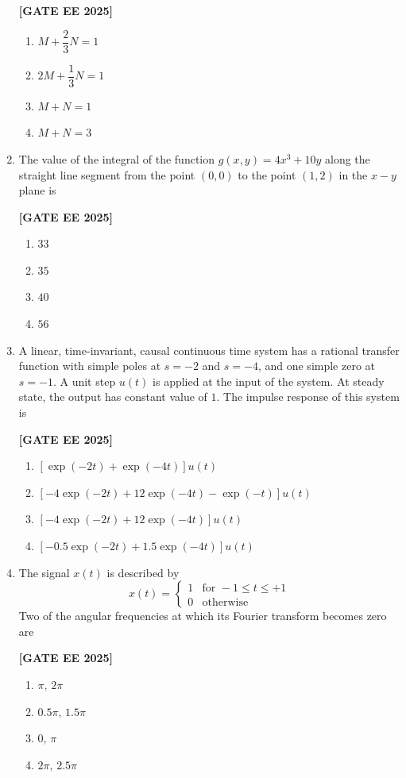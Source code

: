 \documentclass[12pt]{article}
\begin{document}
\begin{enumerate}[leftmargin=*, label=\textbf{Q.\arabic*:}]
\noindent \textbf{[GATE EE 2025]}
\begin{enumerate}
    \item $M + \dfrac{2}{3} N = 1$
    \item $2M + \dfrac{1}{3}N = 1$
    \item $M + N = 1$
    \item $M + N = 3$
\end{enumerate}

\item The value of the integral of the function $g(x, y) = 4x^3 + 10y$ along the straight line segment from the point $(0,0)$ to the point $(1,2)$ in the $x-y$ plane is
 
\noindent \textbf{[GATE EE 2025]}
\begin{enumerate}
    \item $33$
    \item $35$
    \item $40$
    \item $56$
\end{enumerate}

\item A linear, time-invariant, causal continuous time system has a rational transfer function with simple poles at $s=-2$ and $s= -4$, and one simple zero at $s=-1$. A unit step $u(t)$ is applied at the input of the system. At steady state, the output has constant value of $1$. The impulse response of this system is
 
\noindent \textbf{[GATE EE 2025]}
\begin{enumerate}
    \item $\left[\exp(-2t)+\exp(-4t) \right]u(t)$
    \item $\left[ -4\exp(-2t) + 12\exp(-4t) -\exp(-t) \right]u(t)$
    \item $\left[ -4\exp(-2t) + 12\exp(-4t) \right]u(t)$
    \item $\left[ -0.5\exp(-2t) + 1.5\exp(-4t) \right]u(t)$
\end{enumerate}

\item The signal $x(t)$ is described by
\[
x(t) = \begin{cases}
1 & \text{for } -1 \leq t \leq +1 \\
0 & \text{otherwise}
\end{cases}
\]
Two of the angular frequencies at which its Fourier transform becomes zero are
 
\noindent \textbf{[GATE EE 2025]}
\begin{enumerate}
    \item $\pi,\,2\pi$
    \item $0.5\pi,\,1.5\pi$
    \item $0,\,\pi$
    \item $2\pi,\,2.5\pi$
\end{enumerate}


\end{enumerate}
\end{document}
